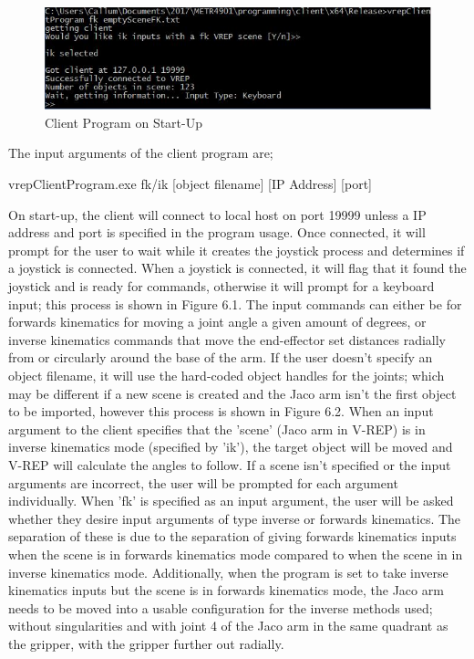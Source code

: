 \documentclass[12pt,openany,a4paper]{book}
\begin{document}
\begin{center}
\begin{figure}[htb]
  \includegraphics[width=\linewidth]{client_start_up.jpg}
\caption{ Client Program on Start-Up }
\end{figure}
\end{center}
The input arguments of the client program are;


vrepClientProgram.exe fk/ik [object filename] [IP Address] [port]


On start-up, the client will connect to local host on port 19999 unless a IP address and port is specified in the program usage. Once connected, it will prompt for the user to wait while it creates the joystick process and determines if a joystick is connected. When a joystick is connected, it will flag that it found the joystick and is ready for commands, otherwise it will prompt for a keyboard input; this process is shown in Figure 6.1. The input commands can either be for forwards kinematics for moving a joint angle a given amount of degrees, or inverse kinematics commands that move the end-effector set distances radially from or circularly around the base of the arm. If the user doesn't specify an object filename, it will use the hard-coded object handles for the joints; which may be different if a new scene is created and the Jaco arm isn't the first object to be imported, however this process is shown in Figure 6.2. 
When an input argument to the client specifies that the 'scene' (Jaco arm in V-REP) is in inverse kinematics mode (specified by 'ik'), the target object will be moved and V-REP will calculate the angles to follow. If a scene isn't specified or the input arguments are incorrect, the user will be prompted for each argument individually. When 'fk' is specified as an input argument, the user will be asked whether they desire input arguments of type inverse or forwards kinematics. The separation of these is due to the separation of giving forwards kinematics inputs when the scene is in forwards kinematics mode compared to when the scene in in inverse kinematics mode. Additionally, when the program is set to take inverse kinematics inputs but the scene is in forwards kinematics mode, the Jaco arm needs to be moved into a usable configuration for the inverse methods used; without singularities and with joint 4 of the Jaco arm in the same quadrant as the gripper, with the gripper further out radially.
\end{document}
